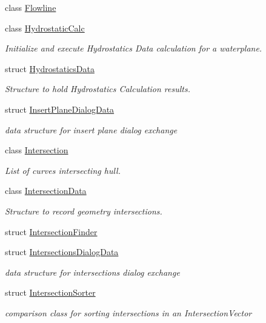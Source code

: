 \begin{DoxyCompactItemize}
\item 
class \hyperlink{classShipCAD_1_1Flowline}{Flowline}
\item 
class \hyperlink{classShipCAD_1_1HydrostaticCalc}{Hydrostatic\+Calc}
\begin{DoxyCompactList}\small\item\em Initialize and execute Hydrostatics Data calculation for a waterplane. \end{DoxyCompactList}\item 
struct \hyperlink{structShipCAD_1_1HydrostaticsData}{Hydrostatics\+Data}
\begin{DoxyCompactList}\small\item\em Structure to hold Hydrostatics Calculation results. \end{DoxyCompactList}\item 
struct \hyperlink{structShipCAD_1_1InsertPlaneDialogData}{Insert\+Plane\+Dialog\+Data}
\begin{DoxyCompactList}\small\item\em data structure for insert plane dialog exchange \end{DoxyCompactList}\item 
class \hyperlink{classShipCAD_1_1Intersection}{Intersection}
\begin{DoxyCompactList}\small\item\em List of curves intersecting hull. \end{DoxyCompactList}\item 
class \hyperlink{classShipCAD_1_1IntersectionData}{Intersection\+Data}
\begin{DoxyCompactList}\small\item\em Structure to record geometry intersections. \end{DoxyCompactList}\item 
struct \hyperlink{structShipCAD_1_1IntersectionFinder}{Intersection\+Finder}
\item 
struct \hyperlink{structShipCAD_1_1IntersectionsDialogData}{Intersections\+Dialog\+Data}
\begin{DoxyCompactList}\small\item\em data structure for intersections dialog exchange \end{DoxyCompactList}\item 
struct \hyperlink{structShipCAD_1_1IntersectionSorter}{Intersection\+Sorter}
\begin{DoxyCompactList}\small\item\em comparison class for sorting intersections in an Intersection\+Vector \end{DoxyCompactList}\item 

\end{DoxyCompactItemize}

